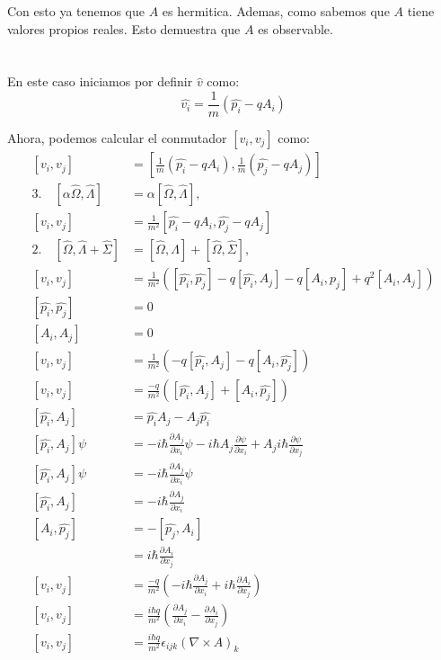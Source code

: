\documentclass{report}
\begin{document}
Con esto ya tenemos que $A$ es hermitica. Ademas, como sabemos que $A$ tiene valores propios reales. Esto demuestra que $A$ es observable.

\chapter{}

En este caso iniciamos por definir $\hat{v}$ como:
\[
	\hat{v_i} = \frac{1}{m}\left( \hat{p_i} - qA_i \right)
\]

Ahora, podemos calcular el conmutador $\left[ v_i, v_j \right]$ como:
\begin{align*}
	\left[ v_i, v_j \right] &= \left[ \frac{1}{m}\left( \hat{p_i} - qA_i \right), \frac{1}{m}\left( \hat{p_j} - qA_j \right) \right]\\
	3.\quad \left[ \alpha \hat{\Omega}, \hat{\Lambda} \right] &= \alpha \left[ \hat{\Omega}, \hat{\Lambda} \right], \\
	\left[ v_i, v_j \right] &= \frac{1}{m^2}\left[ \hat{p_i} - qA_i, \hat{p_j} - qA_j \right]\\
	2.\quad \left[ \hat{\Omega}, \hat{\Lambda} + \hat{\Sigma} \right] &= \left[ \hat{\Omega}, \hat{\Lambda} \right] + \left[ \hat{\Omega}, \hat{\Sigma} \right], \\
	\left[ v_i, v_j \right] &= \frac{1}{m^2}\left(\left[ \hat{p_i}, \hat{p_j}\right] - q\left[\hat{p_i}, A_j\right] - q\left[A_i, \hat{p_j}\right] + q^2 \left[A_i, A_j \right]\right)\\
	\left[ \hat{p_i}, \hat{p_j}\right] &= 0\\
	\left[ A_i, A_j \right] &= 0\\
	\left[ v_i, v_j \right] &= \frac{1}{m^2}\left( - q\left[\hat{p_i}, A_j\right] - q\left[A_i, \hat{p_j}\right] \right)\\
	\left[ v_i, v_j \right] &= \frac{- q}{m^2}\left( \left[\hat{p_i}, A_j\right] + \left[A_i, \hat{p_j}\right] \right)\\
	\left[\hat{p_i}, A_j\right] &= \hat{p_i}A_j - A_j\hat{p_i}\\
	\left[\hat{p_i}, A_j\right] \psi &= -i\hbar\frac{\partial A_j}{\partial x_i}\psi - i\hbar A_j\frac{\partial \psi}{\partial x_i} + A_j i\hbar\frac{\partial \psi}{\partial x_j}\\
	\left[\hat{p_i}, A_j\right] \psi &= -i\hbar\frac{\partial A_j}{\partial x_i}\psi \\
	\left[\hat{p_i}, A_j\right] &= -i\hbar\frac{\partial A_j}{\partial x_i} \\
	\left[A_i, \hat{p_j}\right] &= - \left[ \hat{p_j}, A_i \right]\\
	&= i\hbar\frac{\partial A_i}{\partial x_j} \\
	\left[ v_i, v_j \right] &= \frac{- q}{m^2}\left( -i\hbar\frac{\partial A_j}{\partial x_i} + i\hbar\frac{\partial A_i}{\partial x_j} \right)\\
	\left[ v_i, v_j \right] &= \frac{i\hbar q}{m^2}\left( \frac{\partial A_j}{\partial x_i} - \frac{\partial A_i}{\partial x_j} \right)\\
	\left[ v_i, v_j \right] &= \frac{i\hbar q}{m^2}\epsilon_{ijk}\left( \nabla \times A  \right)_k
\end{align*}
\end{document}
